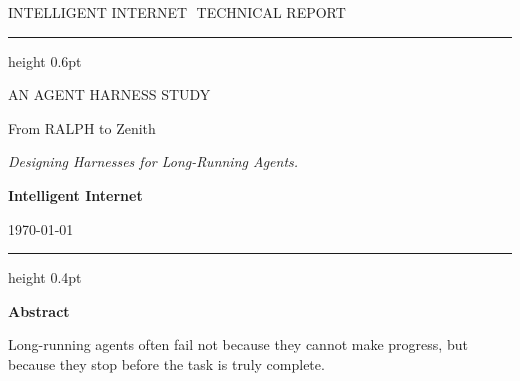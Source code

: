 \documentclass[11pt,a4paper]{article}
\title{}
\author{}
\date{}
\newcommand{\eyebrow}[1]{{\sffamily\footnotesize\color{accent}\MakeUppercase{#1}}}
\begin{document}
\begin{titlepage}
\thispagestyle{empty}

\vspace*{1.2cm}

\begin{center}
{\sffamily\footnotesize\color{accent}\MakeUppercase{Intelligent Internet}\,\,{\color{muted}\textbullet}\,\,{\color{muted}\MakeUppercase{Technical Report}}\par}
\vspace{0.45cm}
{\color{rule}\hrule height 0.6pt}
\end{center}

\vspace{1.8cm}

\begin{center}
\eyebrow{An agent harness study}\par
\vspace{0.7cm}

{\titlefont\fontsize{34pt}{40pt}\selectfont\color{ink}
From RALPH to Zenith\par}
\vspace{0.45cm}

{\titlefont\fontsize{17pt}{22pt}\selectfont\itshape\color{accentdark}
Designing Harnesses for Long-Running Agents.\par}

\vspace{2.0cm}

{\sffamily\large\color{ink}\textbf{Intelligent Internet}\par}
\vspace{0.35cm}
{\sffamily\normalsize\color{muted}\today\par}
\end{center}

\vspace{1.6cm}

\begin{center}
{\color{rule}\hrule height 0.4pt}
\end{center}

\vspace{0.8cm}

{\sffamily\fontsize{14pt}{18pt}\selectfont\bfseries\color{accentdark}Abstract\par}
\vspace{0.45cm}

\begin{epigraph}
Long-running agents often fail not because they cannot make progress, but because they stop before the task is truly complete.


\end{epigraph}
\end{titlepage}
\end{document}
